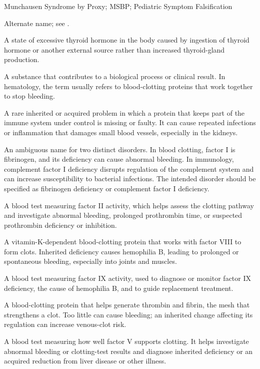 \synonyms
Munchausen Syndrome by Proxy; MSBP; Pediatric Symptom Falsification

 Alternate name; see .

 A state of excessive thyroid hormone in the body caused by ingestion of thyroid hormone or another external source rather than increased thyroid-gland production.

 A substance that contributes to a biological process or clinical result. In hematology, the term usually refers to blood-clotting proteins that work together to stop bleeding.

 A rare inherited or acquired problem in which a protein that keeps part of the immune system under control is missing or faulty. It can cause repeated infections or inflammation that damages small blood vessels, especially in the kidneys.

 An ambiguous name for two distinct disorders. In blood clotting, factor I is fibrinogen, and its deficiency can cause abnormal bleeding. In immunology, complement factor I deficiency disrupts regulation of the complement system and can increase susceptibility to bacterial infections. The intended disorder should be specified as fibrinogen deficiency or complement factor I deficiency.

 A blood test measuring factor II activity, which helps assess the clotting pathway and investigate abnormal bleeding, prolonged prothrombin time, or suspected prothrombin deficiency or inhibition.

 A vitamin-K-dependent blood-clotting protein that works with factor VIII to form clots. Inherited deficiency causes hemophilia B, leading to prolonged or spontaneous bleeding, especially into joints and muscles.

 A blood test measuring factor IX activity, used to diagnose or monitor factor IX deficiency, the cause of hemophilia B, and to guide replacement treatment.

 A blood-clotting protein that helps generate thrombin and fibrin, the mesh that strengthens a clot. Too little can cause bleeding; an inherited change affecting its regulation can increase venous-clot risk.

 A blood test measuring how well factor V supports clotting. It helps investigate abnormal bleeding or clotting-test results and diagnose inherited deficiency or an acquired reduction from liver disease or other illness.

